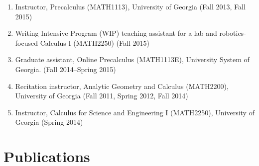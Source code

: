 \documentclass[letterpaper]{article}
\begin{document}
\begin{enumerate}
\item Instructor, Precalculus (MATH1113), University of Georgia (Fall 2013, Fall 2015)
\item Writing Intensive Program (WIP) teaching assistant for a lab and robotics-focused Calculus I (MATH2250) (Fall 2015)
\item Graduate assistant, Online
  Precalculus (MATH1113E), University System of Georgia. (Fall 2014--Spring 2015)
\item Recitation instructor, Analytic Geometry and Calculus
  (MATH2200), University of Georgia (Fall 2011, Spring 2012, Fall 2014)
\item Instructor, Calculus for Science and Engineering I (MATH2250), University of Georgia (Spring 2014)
\end{enumerate}

\section*{Publications}
\end{document}
